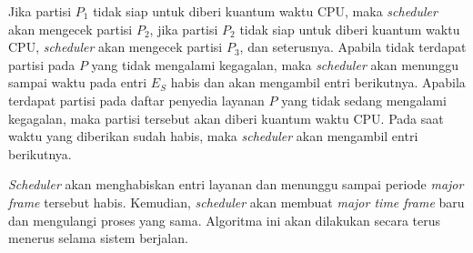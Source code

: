 Jika partisi $P_1$ tidak siap untuk diberi kuantum waktu CPU, maka \textit{scheduler} akan mengecek
partisi $P_2$, jika partisi $P_2$ tidak siap untuk diberi kuantum waktu CPU, \textit{scheduler} akan
mengecek partisi $P_3$, dan seterusnya.  Apabila tidak terdapat partisi pada $P$ yang tidak
mengalami kegagalan, maka \textit{scheduler} akan menunggu sampai waktu pada entri $E_S$ habis
dan akan mengambil entri berikutnya.  Apabila terdapat partisi pada daftar penyedia layanan $P$
yang tidak sedang mengalami kegagalan, maka partisi tersebut akan diberi kuantum waktu CPU.  Pada saat
waktu yang diberikan sudah habis, maka \textit{scheduler} akan mengambil entri berikutnya.

\textit{Scheduler} akan menghabiskan entri layanan dan menunggu sampai periode \textit{major
frame} tersebut habis. Kemudian, \textit{scheduler} akan membuat \textit{major time frame} baru
dan mengulangi proses yang sama.  Algoritma ini akan dilakukan secara terus menerus selama
sistem berjalan.

